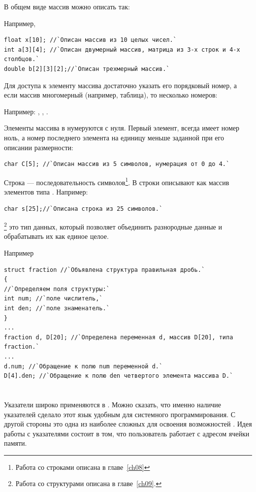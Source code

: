 В общем виде массив можно описать так:


Например,
\begin{lstlisting}
float x[10]; //`Описан массив из 10 целых чисел.`
int a[3][4]; //`Описан двумерный массив, матрица из 3-х строк и 4-х столбцов.`
double b[2][3][2];//`Описан трехмерный массив.`
\end{lstlisting}
Для доступа к элементу массива достаточно указать его порядковый номер, а если
массив многомерный (например, таблица), то несколько номеров:



Например: , , .

Элементы массива в  нумеруются с нуля. Первый элемент, всегда имеет 
номер ноль, а номер последнего элемента на
единицу меньше заданной при его описании размерности: 
\begin{lstlisting}
char C[5]; //`Описан массив из 5 символов, нумерация от 0 до 4.`
\end{lstlisting}

Строка --- последовательность символов\footnote{Работа со строками описана в главе~\ref{ch08}}. В
 строки описывают как массив элементов типа . Например:
\begin{lstlisting}
char s[25];//`Описана строка из 25 символов.`
\end{lstlisting}
\footnote{Работа со структурами описана в главе~\ref{ch09}.} это тип данных,
который позволяет объединить разнородные данные и обрабатывать их как единое целое.

Например
\begin{lstlisting}
struct fraction //`Объявлена структура правильная дробь.`
{
//`Определяем поля структуры:`
int num; //`поле числитель,`
int den; //`поле знаменатель.`
}
...
fraction d, D[20]; //`Определена переменная d, массив D[20], типа fraction.`
...
d.num; //`Обращение к полю num переменной d.`
D[4].den; //`Обращение к полю den четвертого элемента массива D.`
\end{lstlisting}

\section[Указатели]{}
Указатели широко применяются в . Можно сказать, что именно наличие указателей сделало этот язык
удобным для системного программирования. С другой стороны это одна из наиболее сложных для освоения возможностей .
Идея работы с указателями состоит в том, что пользователь работает с адресом ячейки памяти.

